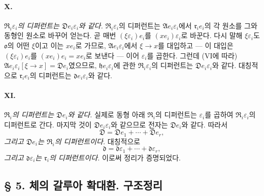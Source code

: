 \paragraph{X.}
\emph{\(\mathfrak R_i\varepsilon_i\)의 디퍼런트는 \(\mathfrak D e_i\varepsilon_i\)와 같다.} \(\mathfrak R_i\varepsilon_i\)의 디퍼런트는 \(\mathfrak A e_i\varepsilon_i\)에서 \(\mathfrak r_i e_i\)의 각 원소를 그와 동형인 원소로 바꾸어 얻는다. 곧 매번 \((\xi\varepsilon_i)e_i\)를 \((xe_i)\varepsilon_i\)로 바꾼다. 다시 말해 \(\xi\varepsilon_i\)도 \(\mathfrak o\)의 어떤 \(\xi\)이고 이는 \(xe_i\)로 가므로, \(\mathfrak A e_i\varepsilon_i\)에서 \(\xi\to x\)를 대입하고 --- 이 대입은 \((\xi\varepsilon_i)e_i\)를 \((xe_i)e_i=xe_i\)로 보낸다 --- 이어 \(\varepsilon_i\)를 곱한다. 그런데 (VI에 따라) \(\mathfrak A e_i\varepsilon_i[\xi\to x]=\mathfrak D e_i\)였으므로, \(\mathfrak h e_i\varepsilon_i\)에 관한 \(\mathfrak R_i\varepsilon_i\)의 디퍼런트는 \(\mathfrak D e_i\varepsilon_i\)와 같다. 대칭적으로 \(\mathfrak r_i e_i\)의 디퍼런트는 \(\mathfrak d e_i\varepsilon_i\)와 같다.

\paragraph{XI.}
\emph{\(\mathfrak R_i\)의 디퍼런트는 \(\mathfrak D e_i\)와 같다.} 실제로 동형 아래 \(\mathfrak R_i\)의 디퍼런트는 \(\varepsilon_i\)를 곱하여 \(\mathfrak R_i\varepsilon_i\)의 디퍼런트로 간다. 마지막 것이 \(\mathfrak D e_i\varepsilon_i\)와 같으므로 전자는 \(\mathfrak D e_i\)와 같다. 따라서
\[
\mathfrak D=\mathfrak D e_1+\cdots+\mathfrak D e_r,
\]
\emph{그리고 \(\mathfrak D e_i\)는 \(\mathfrak R_i\)의 디퍼런트이다.} 대칭적으로
\[
\mathfrak d=\mathfrak d\varepsilon_1+\cdots+\mathfrak d\varepsilon_r,
\]
\emph{그리고 \(\mathfrak d\varepsilon_i\)는 \(\mathfrak r_i\)의 디퍼런트이다.} 이로써 정리가 증명되었다.

\subsection*{§ 5. 체의 갈루아 확대환. 구조정리}

